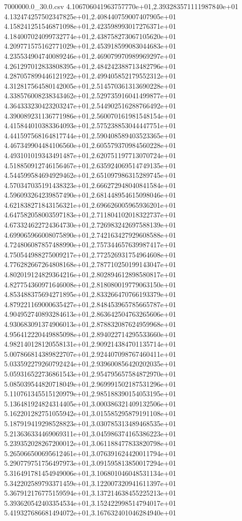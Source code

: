 \begin{filecontents*}{7000000.0_30.0.csv}
4.106706041963757770e+01,2.393283571111987840e+01
4.132474257502347825e+01,2.408440759007407905e+01
4.158241251546871098e+01,2.423598993017276371e+01
4.184007024099732774e+01,2.438758273067105620e+01
4.209771575162771029e+01,2.453918599083044683e+01
4.235534904740089246e+01,2.469079970989969297e+01
4.261297012833808395e+01,2.484242388713482796e+01
4.287057899446121922e+01,2.499405852179552312e+01
4.312817564580142005e+01,2.514570361313690228e+01
4.338576008238343462e+01,2.529735916041499877e+01
4.364333230423203247e+01,2.544902516288766492e+01
4.390089231136771986e+01,2.560070161981548154e+01
4.415844010383364093e+01,2.575238853044447751e+01
4.441597568164817744e+01,2.590408589403523365e+01
4.467349904484106560e+01,2.605579370984560228e+01
4.493101019343491487e+01,2.620751197713070724e+01
4.518850912746156467e+01,2.635924069514749135e+01
4.544599584694929462e+01,2.651097986315289745e+01
4.570347035191438323e+01,2.666272948040841584e+01
4.596093264239857490e+01,2.681448954615098046e+01
4.621838271843156321e+01,2.696626005965936201e+01
4.647582058003597183e+01,2.711804102018322737e+01
4.673324622724364730e+01,2.726983242697588139e+01
4.699065966008075890e+01,2.742163427929608588e+01
4.724806087857488990e+01,2.757344657639987417e+01
4.750544988275009217e+01,2.772526931754964608e+01
4.776282667264808168e+01,2.787710250199143047e+01
4.802019124829364216e+01,2.802894612898580817e+01
4.827754360971646008e+01,2.818080019779063150e+01
4.853488375694271895e+01,2.833266470766193379e+01
4.879221169000635427e+01,2.848453965785665787e+01
4.904952740893284613e+01,2.863642504763265606e+01
4.930683091374906013e+01,2.878832087624959968e+01
4.956412220449885098e+01,2.894022714295533660e+01
4.982140128120558131e+01,2.909214384701135714e+01
5.007866814389822707e+01,2.924407098767460411e+01
5.033592279260792424e+01,2.939600856420202035e+01
5.059316522736861543e+01,2.954795657584872970e+01
5.085039544820718049e+01,2.969991502187531296e+01
5.110761345515120979e+01,2.985188390154053195e+01
5.136481924824314405e+01,3.000386321409132506e+01
5.162201282751055942e+01,3.015585295879191108e+01
5.187919419298528823e+01,3.030785313489468535e+01
5.213636334469069311e+01,3.045986374165386223e+01
5.239352028267200012e+01,3.061188477833820798e+01
5.265066500695612461e+01,3.076391624420011794e+01
5.290779751756497973e+01,3.091595813850017294e+01
5.316491781454949006e+01,3.106801046048531134e+01
5.342202589793371459e+01,3.122007320941611397e+01
5.367912176775159594e+01,3.137214638455225213e+01
5.393620542403354534e+01,3.152422998514794017e+01
5.419327686681494072e+01,3.167632401046284940e+01

\end{filecontents*}
